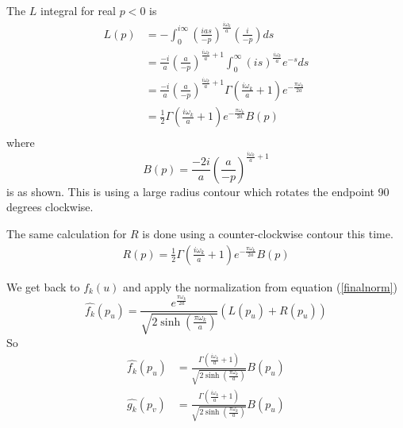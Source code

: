 \documentclass[12pt,a4paper]{article}
\begin{document}
The $L$ integral for real $p<0$ is
\begin{equation}
\begin{split}
  L(p) & = -\int_0^{i\infty} \left(\frac{ias}{-p}\right)^\frac{i\omega_k}{a} \left(\frac{i}{-p}\right)ds \\
  & = \frac{-i}{a} \left(\frac{a}{-p}\right)^{\frac{i\omega_k}{a} + 1} \int_0^\infty \left(is\right) ^ \frac{i\omega_k}{a} e^{-s} ds \\
  & = \frac{-i}{a} \left(\frac{a}{-p}\right)^{\frac{i\omega_k}{a} + 1} \Gamma\left(\frac{i\omega_k}{a} + 1\right) e^{-\frac{\pi \omega_k}{2a}} \\
  & = \frac{1}{2} \Gamma\left(\frac{i\omega_k}{a} + 1\right) e^{-\frac{\pi \omega_k}{2a}} B(p)\\
\end{split}
\end{equation}
where
\begin{equation}
B(p) = \frac{-2i}{a} \left(\frac{a}{-p}\right)^{\frac{i\omega_k}{a} + 1} 
\end{equation}
is as shown.  This is using a large radius contour which rotates the endpoint 90 degrees clockwise.

The same calculation for $R$ is done using a counter-clockwise contour this time.
\begin{equation}
\begin{split}
  R(p) = \frac{1}{2}\Gamma\left(\frac{i\omega_k}{a} + 1\right) e^{-\frac{\pi \omega_k}{2a}} B(p)
\end{split}
\end{equation}

We get back to $f_k(u)$ and apply the normalization from equation (\ref{finalnorm})
\begin{equation}
\widehat{f_k}(p_u) = \frac{e^{\frac{\pi \omega_k}{2a}}}{\sqrt{2 \sinh \left({\frac{\pi\omega_k}{a}}\right)}}  ( L(p_u) + R(p_u) )
\end{equation}
So
\begin{equation}
\label{fourier}
\begin{split}
\widehat{f_k}(p_u) & = \frac{\Gamma\left(\frac{i\omega_k}{a} + 1\right)}{\sqrt{2 \sinh \left({\frac{\pi\omega_k}{a}}\right)}} B(p_u)\\
\widehat{g_k}(p_v) &= \frac{\Gamma\left(\frac{i\omega_k}{a} + 1\right)}{\sqrt{2 \sinh \left({\frac{\pi\omega_k}{a}}\right)}} B(p_u)
\end{split}
\end{equation}
\end{document}
